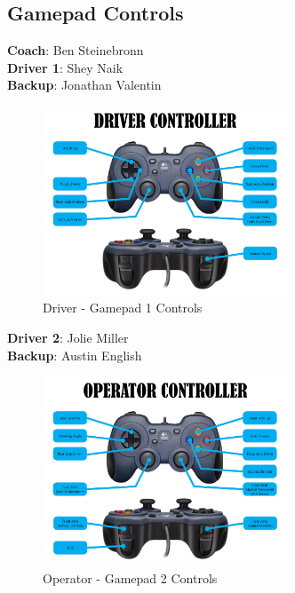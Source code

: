 \clearpage
{}
\subsection*{\textbf{\Huge Gamepad Controls}}
\vspace{.2cm}
\setlength{\parindent}{.25in} 

\textbf{Coach}: Ben Steinebronn \\
\textbf {Driver 1}: Shey Naik \\
\textbf {Backup}:	Jonathan Valentin \\
\begin{figure}[h!]
\centering
\includegraphics[width=0.65\textwidth, angle=0]{Design_Overview/DriverController.png}
\caption{Driver - Gamepad 1 Controls}
\label{fig:Gamepad1}
\end{figure}

\clearpage

\textbf{Driver 2}: Jolie Miller \\
\indent \textbf{Backup}: Austin English \\
\begin{figure}[h!]
\centering
\includegraphics[width=0.65\textwidth, angle=0]{Design_Overview/OperatorController.png}
\caption{Operator - Gamepad 2 Controls}
\label{fig:Gamepad2}
\end{figure}
